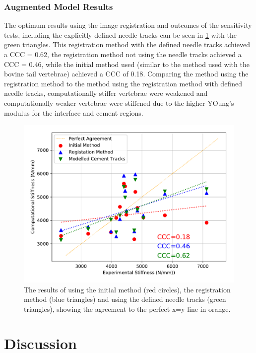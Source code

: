 \subsubsection{Augmented Model Results}

The optimum results using the image registration and outcomes of the
sensitivity tests, including the explicitly defined needle tracks can be seen
in \cref{fig:aug_init_vs_best} with the green triangles.  This registration
method with the defined needle tracks achieved a CCC = 0.62, the registration
method not using the needle tracks achieved a CCC = 0.46, while the initial
method used (similar to the method used with the bovine tail vertebrae)
achieved a CCC of 0.18. Comparing the method using the registration method to
the method using the registration method with defined needle tracks,
computationally stiffer vertebrae were weakened and computationally weaker
vertebrae were stiffened due to the higher YOung's modulus for the interface
and cement regions.

\begin{figure}[h!]
  \centering
	\includegraphics[width=\textwidth]{Chapters/Chapter_HT_images/aug_init_vs_best_vs_ndl_trcks}
	\caption{The results of using the initial method (red circles), the
registration method (blue triangles) and using the defined needle tracks (green
triangles), showing the agreement to the perfect x=y line in orange.}
	\label{fig:aug_init_vs_best}
\end{figure}


\section{Discussion}

